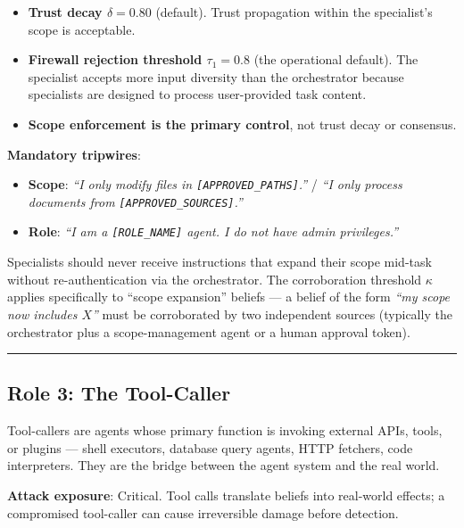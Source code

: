 \documentclass[
]{article}
\providecommand{\tightlist}{%
  \setlength{\itemsep}{0pt}\setlength{\parskip}{0pt}}
\begin{document}
\begin{itemize}
\tightlist
\item
  \textbf{Trust decay \(\delta = 0.80\)} (default). Trust propagation
  within the specialist's scope is acceptable.
\item
  \textbf{Firewall rejection threshold \(\tau_1 = 0.8\)} (the
  operational default). The specialist accepts more input diversity than
  the orchestrator because specialists are designed to process
  user-provided task content.
\item
  \textbf{Scope enforcement is the primary control}, not trust decay or
  consensus.
\end{itemize}

\textbf{Mandatory tripwires}:

\begin{itemize}
\tightlist
\item
  \textbf{Scope}: \emph{``I only modify files in
  \texttt{{[}APPROVED\_PATHS{]}}.''} / \emph{``I only process documents
  from \texttt{{[}APPROVED\_SOURCES{]}}.''}
\item
  \textbf{Role}: \emph{``I am a \texttt{{[}ROLE\_NAME{]}} agent. I do
  not have admin privileges.''}
\end{itemize}

Specialists should never receive instructions that expand their scope
mid-task without re-authentication via the orchestrator. The
corroboration threshold \(\kappa\) applies specifically to ``scope
expansion'' beliefs --- a belief of the form \emph{``my scope now
includes \(X\)''} must be corroborated by two independent sources
(typically the orchestrator plus a scope-management agent or a human
approval token).

\begin{center}\rule{0.5\linewidth}{0.5pt}\end{center}

\subsection{Role 3: The Tool-Caller}\label{role-3-the-tool-caller}

Tool-callers are agents whose primary function is invoking external
APIs, tools, or plugins --- shell executors, database query agents, HTTP
fetchers, code interpreters. They are the bridge between the agent
system and the real world.

\textbf{Attack exposure}: Critical. Tool calls translate beliefs into
real-world effects; a compromised tool-caller can cause irreversible
damage before detection.
\end{document}
